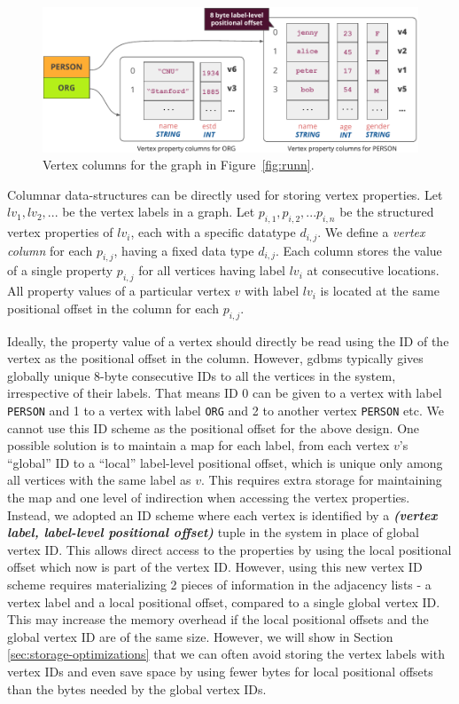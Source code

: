 \begin{figure}
	\hfill\includegraphics[scale=0.85]{img/vpcols}\hspace*{\fill}
	\caption{Vertex columns for the graph in Figure~\ref{fig:runn}.}
	\label{fig:vpcols}
\end{figure}

Columnar data-structures can be directly used for storing vertex properties. Let $lv_1, lv_2, ...$ be the vertex labels in a graph. Let $p_{i,1},  p_{i,2}, ... p_{i, n}$ be the structured vertex properties of $lv_i$, each with a specific datatype $d_{i,j}$. We define a \emph{vertex column} for each $p_{i,j}$, having a fixed data type $d_{i,j}$. Each column stores the value of a single property $p_{i,j}$ for all vertices having label $lv_i$ at consecutive locations. All property values of a particular vertex $v$ with label $lv_i$ is located at the same positional offset in the column for each $p_{i,j}$. 


Ideally, the property value of a vertex should directly be read using the ID of the vertex as the positional offset in the column. However, \gls{gdbms} typically gives globally unique 8-byte consecutive IDs to all the vertices in the system, irrespective of their labels. That means ID 0 can be given to a vertex with label \texttt{PERSON} and 1 to a vertex with label \texttt{ORG} and 2 to another vertex \texttt{PERSON} etc. We cannot use this ID scheme as the positional offset for the above design. One possible solution is to maintain a map for each label, from each vertex $v$'s \enquote{global} ID to a \enquote{local} label-level positional offset, which is unique only among all vertices with the same label as $v$. This requires extra storage for maintaining the map and one level of indirection when accessing the vertex properties. Instead, we adopted an ID scheme where each vertex is identified by a \emph{\textbf{(vertex label, label-level positional offset)}} tuple in the system in place of global vertex ID. This allows direct access to the properties by using the local positional offset which now is part of the vertex ID. However, using this new vertex ID scheme requires materializing 2 pieces of information in the adjacency lists - a vertex label and a local positional offset, compared to a single global vertex ID. This may increase the memory overhead  if the local positional offsets and the global vertex ID are of the same size. However, we will show in Section \ref{sec:storage-optimizations} that we can often avoid storing the vertex labels with vertex IDs and even save space by using fewer bytes for local positional offsets than the bytes needed by the global vertex IDs.


